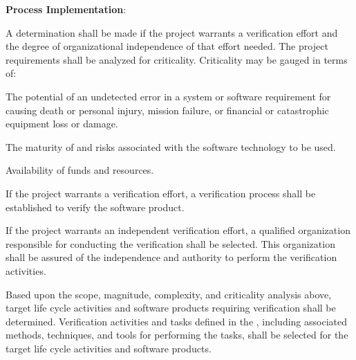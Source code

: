			\begin{adjustwidth}{2em}{0pt} 

				\begin{compactenum}

					\item {\bf Process Implementation}:

					\begin{compactenum}

						\item A determination shall be made if the project warrants a verification effort and the degree of organizational independence of that effort needed. The project requirements shall be analyzed for criticality. Criticality may be gauged in terms of:

						\begin{compactenum}

							\item The potential of an undetected error in a system or software requirement for causing death or personal injury, mission failure, or financial or catastrophic equipment loss or damage.

							\item The maturity of and risks associated with the software technology to be used.

							\item Availability of funds and resources.

						\end{compactenum}

						\item If the project warrants a verification effort, a verification process shall be established to verify the software product.

						\item If the project warrants an independent verification effort, a qualified organization responsible for conducting the verification shall be selected. This organization shall be assured of the independence and authority to perform the verification activities.

						\item Based upon the scope, magnitude, complexity, and criticality analysis above, target life cycle activities and software products requiring verification shall be determined. Verification activities and tasks defined in the , including associated methods, techniques, and tools for performing the tasks, shall be selected for the target life cycle activities and software products.


\end{compactenum}
\end{compactenum}
\end{adjustwidth}
